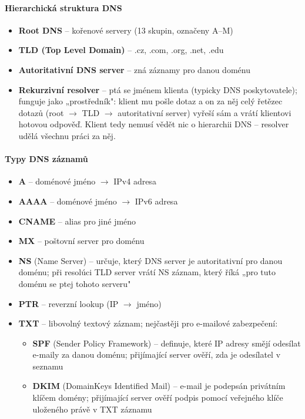 \paragraph{Hierarchická struktura DNS}
\begin{itemize}
  \item \textbf{Root DNS} -- kořenové servery (13 skupin, označeny A--M)
  \item \textbf{TLD (Top Level Domain)} -- .cz, .com, .org, .net, .edu
  \item \textbf{Autoritativní DNS server} -- zná záznamy pro danou doménu
  \item \textbf{Rekurzivní resolver} -- ptá se jménem klienta (typicky DNS poskytovatele);
    funguje jako „prostředník": klient mu pošle dotaz a on za něj celý řetězec dotazů
    (root $\to$ TLD $\to$ autoritativní server) vyřeší sám a vrátí klientovi hotovou odpověď.
    Klient tedy nemusí vědět nic o hierarchii DNS -- resolver udělá všechnu práci za něj.
\end{itemize}

\paragraph{Typy DNS záznamů}
\begin{itemize}
  \item \textbf{A} -- doménové jméno $\to$ IPv4 adresa
  \item \textbf{AAAA} -- doménové jméno $\to$ IPv6 adresa
  \item \textbf{CNAME} -- alias pro jiné jméno
  \item \textbf{MX} -- poštovní server pro doménu
  \item \textbf{NS} (Name Server) -- určuje, který DNS server je autoritativní pro danou doménu;
    při resolúci TLD server vrátí NS záznam, který říká „pro tuto doménu se ptej tohoto serveru"
  \item \textbf{PTR} -- reverzní lookup (IP $\to$ jméno)
  \item \textbf{TXT} -- libovolný textový záznam; nejčastěji pro e-mailové zabezpečení:
    \begin{itemize}
      \item \textbf{SPF} (Sender Policy Framework) -- definuje, které IP adresy smějí odesílat
        e-maily za danou doménu; přijímající server ověří, zda je odesílatel v seznamu
      \item \textbf{DKIM} (DomainKeys Identified Mail) -- e-mail je podepsán privátním klíčem
        domény; přijímající server ověří podpis pomocí veřejného klíče uloženého právě v TXT záznamu
    \end{itemize}
\end{itemize}

